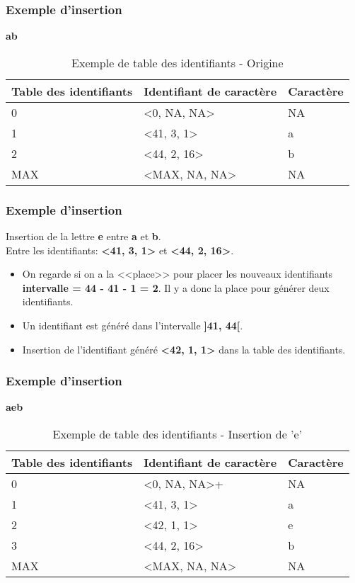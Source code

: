 \begin{frame}  
  \frametitle{Exemple d'insertion}
  	\begin{center}
		\textbf{ab}
	\end{center}
  	\begin{table}
			\center
			\begin{tabular}{|l|l|l|}			
			\hline
				Table des identifiants & Identifiant de caractère & Caractère\\
			\hline
				0 & <0, NA, NA> & NA\\
				1 & <41, 3, 1> & a\\
				2 & <44, 2, 16> & b\\
				MAX & <MAX, NA, NA> & NA\\
			\hline
			\end{tabular}
			\caption{Exemple de table des identifiants - Origine}
		\end{table}
	\end{frame}
	
\begin{frame}  
  \frametitle{Exemple d'insertion}
  	Insertion de la lettre \textbf{e} entre \textbf{a} et \textbf{b}.\\
  	Entre les identifiants:
  	\textbf{<41, 3, 1>} et \textbf{<44, 2, 16>}.
  	\begin{itemize}
		\item On regarde si on a la <<place>> pour placer les nouveaux
			identifiants\\ \textbf{intervalle = 44 - 41 - 1 = 2}. 
			Il y a donc la place pour générer deux identifiants.
		\item Un identifiant est généré dans l'intervalle \textbf{]41, 44[}.
		\item Insertion de l'identifiant généré \textbf{<42, 1, 1>} dans la table des identifiants.
	\end{itemize}
\end{frame}

\begin{frame}	
	\frametitle{Exemple d'insertion}
  	\begin{center}
		\textbf{aeb}
	\end{center}
  	\begin{table}
			\center
			\begin{tabular}{|l|l|l|}			
			\hline
				Table des identifiants & Identifiant de caractère & Caractère\\
			\hline
				0 & <0, NA, NA>+ & NA\\
				1 & <41, 3, 1> & a\\
				2 & <42, 1, 1> & e\\
				3 & <44, 2, 16> & b\\
				MAX & <MAX, NA, NA> & NA\\
			\hline
			\end{tabular}
			\caption{Exemple de table des identifiants - Insertion de 'e'}
		\end{table}
	\end{frame}
